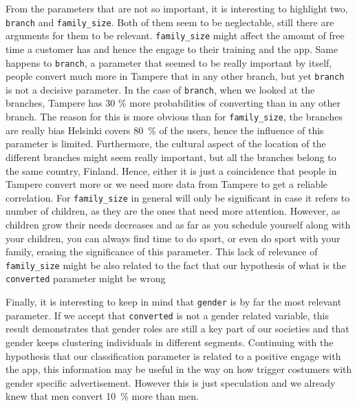 \documentclass{article}
\begin{document}
From the parameters that are not so important, it is interesting to highlight two, \texttt{branch} and \texttt{family\_size}. Both of them seem to be neglectable, still there are arguments for them to be relevant. \texttt{family\_size} might affect the amount of free time a customer has and hence the engage to their training and the app. Same happens to \texttt{branch}, a parameter that seemed to be really important by itself, people convert much more in Tampere that in any other branch, but yet \texttt{branch} is not a decisive parameter. In the case of \texttt{branch}, when we looked at the branches, Tampere has 30 \% more probabilities of converting than in any other branch. The reason for this is more obvious than for \texttt{family\_size}, the branches are really bias Helsinki covers 80~\% of the users, hence the influence of this parameter is limited. Furthermore, the cultural aspect of the location of the different branches might seem really important, but all the branches belong to the same country, Finland. Hence, either it is just a coincidence that people in Tampere convert more or we need more data from Tampere to get a reliable correlation. For \texttt{family\_size} in general will only be significant in case it refers to number of children, as they are the ones that need more attention. However, as children grow their needs decreases and as far as you schedule yourself along with your children, you can always find time to do sport, or even do sport with your family, erasing the significance of this parameter. This lack of relevance of \texttt{family\_size} might be also related to the fact that our hypothesis of what is the \texttt{converted} parameter might be wrong

Finally, it is interesting to keep in mind that \texttt{gender} is by far the most relevant parameter. If we accept that \texttt{converted} is not a gender related variable, this result demonstrates that gender roles are still a key part of our societies and that gender keeps clustering individuals in different segments. Continuing with the hypothesis that our classification parameter is related to a positive engage with the app, this information may be useful in the way on how trigger costumers with gender specific advertisement. However this is just speculation and we already knew that men convert 10~\% more than men.
\end{document}
